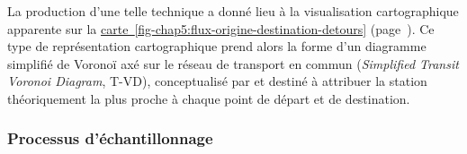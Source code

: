 \begin{refsegment}
La production d'une telle technique a donné lieu à la visualisation cartographique apparente sur la \hyperref[fig-chap5:flux-origine-destination-detours]{carte~\ref{fig-chap5:flux-origine-destination-detours}} (page~\pageref{fig-chap5:flux-origine-destination-detours}). Ce type de représentation cartographique prend alors la forme d'un diagramme simplifié de Voronoï axé sur le réseau de transport en commun (\textsl{Simplified Transit Voronoi Diagram}, T-VD), conceptualisé par \textcolor{blue}{\textcite[5]{chen_transit_2022}} et destiné à attribuer la station théoriquement la plus proche à chaque point de départ et de destination.%


\subsubsection*{Processus d'échantillonnage
    \label{chap5:echantillonnage-detours-pauses}
    }


\end{refsegment}
